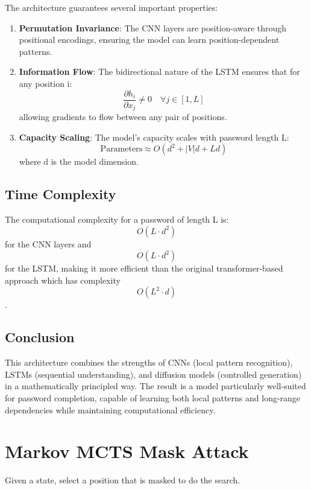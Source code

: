 The architecture guarantees several important properties:

\begin{enumerate}
    \item \textbf{Permutation Invariance}: The CNN layers are position-aware through positional encodings, ensuring the model can learn position-dependent patterns.
    
    \item \textbf{Information Flow}: The bidirectional nature of the LSTM ensures that for any position i:
    $$\frac{\partial h_i}{\partial x_j} \neq 0 \quad \forall j \in [1,L]$$
    allowing gradients to flow between any pair of positions.
    
    \item \textbf{Capacity Scaling}: The model's capacity scales with password length L:
    $$\text{Parameters} \approx O(d^2 + |V|d + Ld)$$
    where d is the model dimension.
\end{enumerate}

\subsection{Time Complexity}

The computational complexity for a password of length L is:
$$O(L \cdot d^2)$$ for the CNN layers and $$O(L \cdot d^2)$$ for the LSTM, making it more efficient than the original transformer-based approach which has complexity $$O(L^2 \cdot d)$$.

\subsection{Conclusion}
This architecture combines the strengths of CNNs (local pattern recognition), LSTMs (sequential understanding), and diffusion models (controlled generation) in a mathematically principled way. The result is a model particularly well-suited for password completion, capable of learning both local patterns and long-range dependencies while maintaining computational efficiency.

\section{Markov MCTS Mask Attack}
Given a state, select a position that is masked to do the search.



